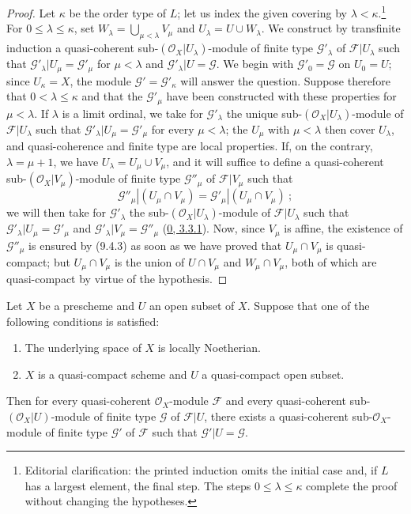 \begin{proof}
Let $\kappa$ be the order type of $L$; let us index the given covering by $\lambda<\kappa$.\footnote{Editorial clarification: the printed induction omits the initial case and, if $L$ has a largest element, the final step. The steps $0\leq\lambda\leq\kappa$ complete the proof without changing the hypotheses.}
For $0\leq\lambda\leq\kappa$, set $W_\lambda=\bigcup_{\mu<\lambda}V_\mu$ and $U_\lambda=U\cup W_\lambda$.
We construct by transfinite induction a quasi-coherent sub-$(\mathscr{O}_X|U_\lambda)$-module of finite type $\mathscr{G}'_\lambda$ of $\mathscr{F}|U_\lambda$ such that $\mathscr{G}'_\lambda|U_\mu=\mathscr{G}'_\mu$ for $\mu<\lambda$ and $\mathscr{G}'_\lambda|U=\mathscr{G}$.
We begin with $\mathscr{G}'_0=\mathscr{G}$ on $U_0=U$; since $U_\kappa=X$, the module $\mathscr{G}'=\mathscr{G}'_\kappa$ will answer the question.
Suppose therefore that $0<\lambda\leq\kappa$ and that the $\mathscr{G}'_\mu$ have been constructed with these properties for $\mu<\lambda$.
If $\lambda$ is a limit ordinal, we take for $\mathscr{G}'_\lambda$ the unique sub-$(\mathscr{O}_X|U_\lambda)$-module of $\mathscr{F}|U_\lambda$ such that $\mathscr{G}'_\lambda|U_\mu=\mathscr{G}'_\mu$ for every $\mu<\lambda$; the $U_\mu$ with $\mu<\lambda$ then cover $U_\lambda$, and quasi-coherence and finite type are local properties.
If, on the contrary, $\lambda=\mu+1$, we have $U_\lambda=U_\mu\cup V_\mu$, and it will suffice to define a
quasi-coherent sub-$(\mathscr{O}_X|V_\mu)$-module of finite type
$\mathscr{G}''_\mu$ of $\mathscr{F}|V_\mu$ such that
\[
  \mathscr{G}''_\mu|(U_\mu\cap V_\mu)
  =\mathscr{G}'_\mu|(U_\mu\cap V_\mu)~;
\]
we will then take for $\mathscr{G}'_\lambda$ the
sub-$(\mathscr{O}_X|U_\lambda)$-module of $\mathscr{F}|U_\lambda$ such that
$\mathscr{G}'_\lambda|U_\mu=\mathscr{G}'_\mu$ and
$\mathscr{G}'_\lambda|V_\mu=\mathscr{G}''_\mu$
(\hyperref[0.3.3.1]{0, 3.3.1}). Now, since $V_\mu$ is affine, the
existence of $\mathscr{G}''_\mu$ is ensured by (9.4.3) as soon as we have
proved that $U_\mu\cap V_\mu$ is quasi-compact; but $U_\mu\cap V_\mu$ is the
union of $U\cap V_\mu$ and $W_\mu\cap V_\mu$, both of which are
quasi-compact by virtue of the hypothesis.
\end{proof}

\begin{theorem}[9.4.7]
\label{I.9.4.7}
Let $X$ be a prescheme and $U$ an open subset of $X$. Suppose that one of
the following conditions is satisfied:
\begin{enumerate}
  \item[(a)] The underlying space of $X$ is locally Noetherian.
  \item[(b)] $X$ is a quasi-compact scheme and $U$ a quasi-compact open
  subset.
\end{enumerate}
Then for every quasi-coherent $\mathscr{O}_X$-module $\mathscr{F}$ and every
quasi-coherent sub-$(\mathscr{O}_X|U)$-module of finite type $\mathscr{G}$ of
$\mathscr{F}|U$, there exists a quasi-coherent sub-$\mathscr{O}_X$-module
of finite type $\mathscr{G}'$ of $\mathscr{F}$ such that
$\mathscr{G}'|U=\mathscr{G}$.
\end{theorem}

